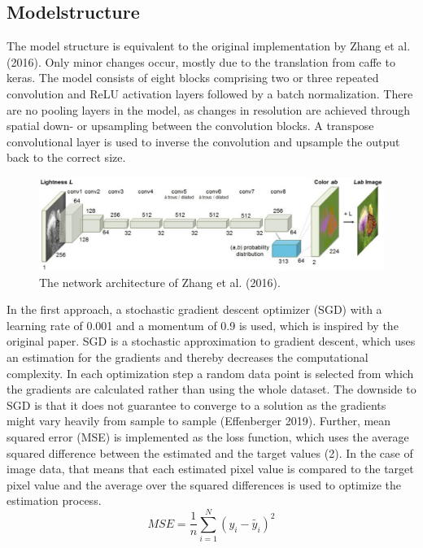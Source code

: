 \documentclass[12pt,letterpaper]{article}
\begin{document}
\subsection{Modelstructure}
The model structure is equivalent to the original implementation by Zhang et al. (2016). Only minor changes occur, mostly due to the translation from caffe to keras. The model consists of eight blocks comprising two or three repeated convolution and ReLU activation layers followed by a batch normalization. There are no pooling layers in the model, as changes  in  resolution  are  achieved  through  spatial  down-  or  upsampling between the convolution blocks. A transpose convolutional layer is used to inverse the convolution and upsample the output back to the correct size.\\
\begin{figure}[ht]
	\centering
	\includegraphics[width=1.0\textwidth]{layer.png}
	\caption{The network architecture of Zhang et al. (2016). }
	\label{network}
\end{figure}
In the first approach, a stochastic gradient descent optimizer (SGD) with a learning rate of 0.001 and a momentum of 0.9 is used, which is inspired by the original paper. SGD is a stochastic approximation to gradient descent, which uses an estimation for the gradients and thereby decreases the computational complexity. In each optimization step a random data point is selected from which the gradients are calculated rather than using the whole dataset. The downside to SGD is that it does not guarantee to converge to a solution as the gradients might vary heavily from sample to sample (Effenberger 2019). Further,  mean squared error (MSE) is implemented as the loss function, which uses the average squared difference between the estimated and the target values (2). In the case of image data, that means that each estimated pixel value is compared to the target pixel value and the average over the squared differences is used to optimize the estimation process.
\begin{equation}
MSE = \frac{1}{n}\sum_{i=1}^N(y_i - \tilde{y_i})^2
\end{equation}
\\
\end{document}
